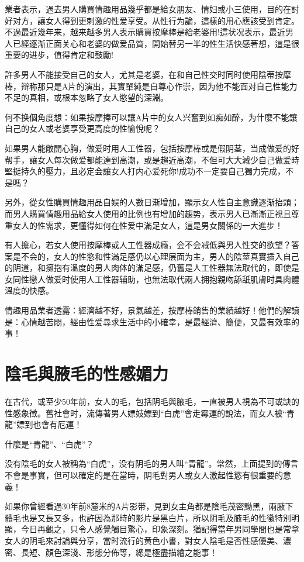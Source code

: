 \documentclass[12pt,UTF8]{ctexbook}
\begin{document}
業者表示，過去男人購買情趣用品幾乎都是給女朋友、情妇或小三使用，目的在討好对方，讓女人得到更刺激的性爱享受。从性行为論，這樣的用心應該受到肯定。不過最近幾年来，越来越多男人表示購買按摩棒是給老婆用!這状况表示，最近男人已經逐渐正面关心和老婆的做爱品質，開始替另一半的性生活快感著想，這是很重要的进步，值得肯定和鼓勵!

許多男人不能接受自己的女人，尤其是老婆，在和自己性交时同时使用陰蒂按摩棒，辩称那只是A片的演出，其實單純是自尊心作崇，因为他不能面对自己性能力不足的真相，或根本忽略了女人慾望的深淵。

何不换個角度想：如果按摩捧可以讓A片中的女人兴奮到如痴如醉，为什麼不能讓自己的女人或老婆享受更高度的性愉悅呢？

如果男人能敞開心胸，做爱时用人工性器，包括按摩棒或是假阴茎，当成做爱的好帮手，讓女人每次做爱都能達到高潮，或是趨近高潮，不但可大大減少自己做爱時堅挺持久的壓力，且必定会讓女人打内心爱死你!成功不一定要自己獨力完成，不是嗎？

另外，從女性購買情趣用品自娛的人數日渐增加，顯示女人性自主意識逐渐抬頭；而男人購買情趣用品給女人使用的比例也有增加的趨势，表示男人已漸漸正視且尊重女人的性需求，更懂得如何在性爱中滿足女人，這是男女關係的一大進步！

有人擔心，若女人使用按摩棒或人工性器成瘾，会不会减低與男人性交的欲望？答案是不会的，女人的性慾和性滿足感仍以心理层面为主，男人的陰莖真實插入自己的阴道，和擁抱有溫度的男人肉体的滿足感，仍舊是人工性器無法取代的，即使是女同性戀人做爱时使用人工性器辅助，也無法取代兩人拥抱親吻舔舐肌膚时具肉體溫度的快感。

情趣用品業者透露：經濟越不好，景氣越差，按摩棒銷售的業績越好！他們的解讀是：心情越苦悶，經由性爱尋求生活中的小確幸，是最經濟、簡便，又最有效率的事！

\chapter{陰毛與腋毛的性感媚力}

在古代，或至少50年前，女人的毛，包括阴毛與腋毛，一直被男人視為不可或缺的性感象徵。舊社會时，流傳著男人嫖妓嫖到“白虎”會走霉運的說法，而女人被“青龍”嫖到也會有厄運！

什麼是“青龍”、“白虎”？

没有陰毛的女人被稱為“白虎”，没有阴毛的男人叫“青龍”。常然，上面提到的傳言不會是事實，但可以確定的是在當時，阴毛對男人或女人激起性慾有很重要的意義！

如果你曾經看過30年前8釐米的A片影带，見到女主角都是陰毛茂密黝黑，兩腋下體毛也是又長又多，也許因為那時的影片是黑白片，所以阴毛及腋毛的性徵特別明顯，今日再觀之，只令人感覺觸目驚心，印象深刻。猶記得當年男同學間也是常拿女人的阴毛來討論與分享，當时流行的黄色小書，對女人陰毛是否性感優美、濃密、長短、顏色深淺、形態分佈等，總是極盡描繪之能事！
\end{document}
